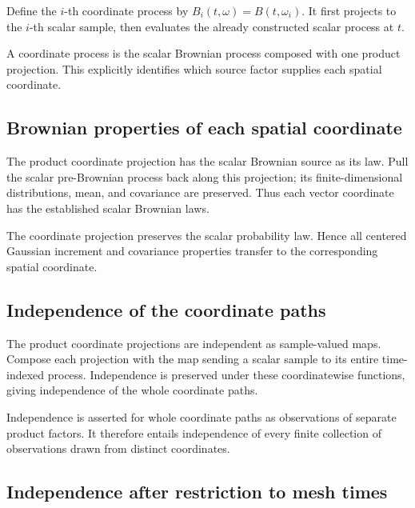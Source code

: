 \documentclass[11pt,a4paper]{report}
\begin{document}
Define the \(i\)-th coordinate process by \(B_i(t,\omega)=B(t,\omega_i)\). It first projects to the \(i\)-th scalar sample, then evaluates the already constructed scalar process at \(t\).



A coordinate process is the scalar Brownian process composed with one product projection. This explicitly identifies which source factor supplies each spatial coordinate.

\subsection{\texorpdfstring{Brownian properties of each spatial coordinate}{Brownian properties of each spatial coordinate}}
\label{report-step-UnadjustedLangevin-CanonicalBrownian-lean-19}


The product coordinate projection has the scalar Brownian source as its law. Pull the scalar pre-Brownian process back along this projection; its finite-dimensional distributions, mean, and covariance are preserved. Thus each vector coordinate has the established scalar Brownian laws.



The coordinate projection preserves the scalar probability law. Hence all centered Gaussian increment and covariance properties transfer to the corresponding spatial coordinate.

\subsection{\texorpdfstring{Independence of the coordinate paths}{Independence of the coordinate paths}}
\label{report-step-UnadjustedLangevin-CanonicalBrownian-lean-20}


The product coordinate projections are independent as sample-valued maps. Compose each projection with the map sending a scalar sample to its entire time-indexed process. Independence is preserved under these coordinatewise functions, giving independence of the whole coordinate paths.



Independence is asserted for whole coordinate paths as observations of separate product factors. It therefore entails independence of every finite collection of observations drawn from distinct coordinates.

\subsection{\texorpdfstring{Independence after restriction to mesh times}{Independence after restriction to mesh times}}
\label{report-step-UnadjustedLangevin-CanonicalBrownian-lean-21}
\end{document}
